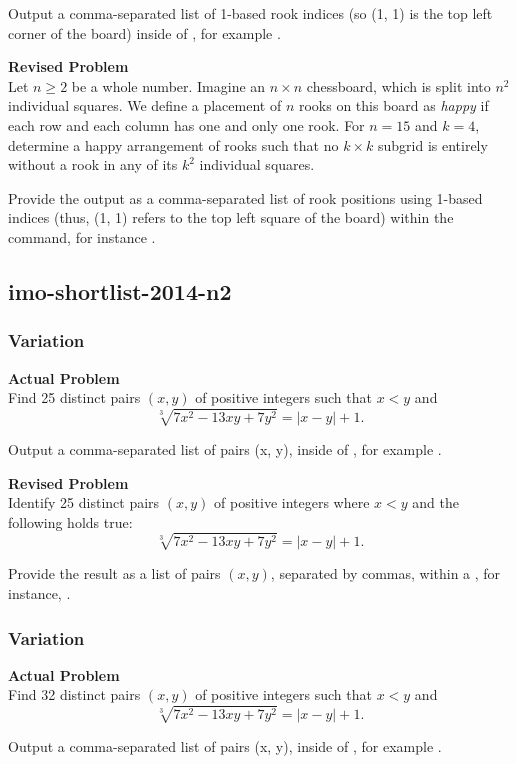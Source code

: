 Output a comma-separated list of 1-based rook indices (so (1, 1) is the top left corner of the board) inside of \boxed, for example .

\textbf{Revised Problem}\\
Let $n \geq 2$ be a whole number. Imagine an $n \times n$ chessboard, which is split into $n^2$ individual squares. We define a placement of $n$ rooks on this board as \textit{happy} if each row and each column has one and only one rook. For $n=15$ and $k=4$, determine a happy arrangement of rooks such that no $k \times k$ subgrid is entirely without a rook in any of its $k^2$ individual squares.

Provide the output as a comma-separated list of rook positions using 1-based indices (thus, (1, 1) refers to the top left square of the board) within the \boxed command, for instance .

\subsection{imo-shortlist-2014-n2}
\subsubsection{Variation}
\textbf{Actual Problem}\\
Find 25 distinct pairs $(x, y)$ of positive integers such that $x<y$ and
$$
\sqrt[3]{7x^2-13xy+7y^2} = |x-y|+1.
$$


Output a comma-separated list of pairs (x, y), inside of \boxed, for example .

\textbf{Revised Problem}\\
Identify 25 distinct pairs \((x, y)\) of positive integers where \(x < y\) and the following holds true:
\[
\sqrt[3]{7x^2 - 13xy + 7y^2} = |x-y| + 1.
\]

Provide the result as a list of pairs \((x, y)\), separated by commas, within a \boxed{ }, for instance, .

\subsubsection{Variation}
\textbf{Actual Problem}\\
Find 32 distinct pairs $(x, y)$ of positive integers such that $x<y$ and
$$
\sqrt[3]{7x^2-13xy+7y^2} = |x-y|+1.
$$


Output a comma-separated list of pairs (x, y), inside of \boxed, for example .

